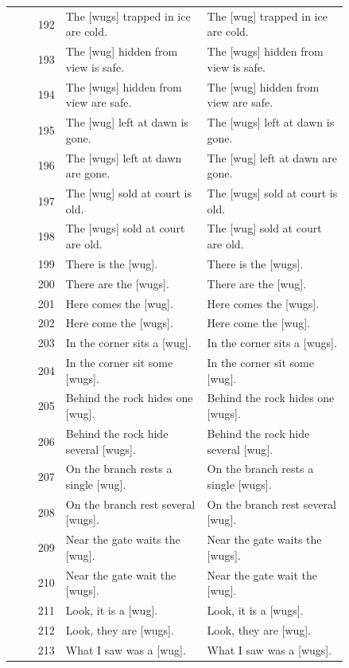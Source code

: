 \begin{longtable}{@{}rp{0.42\linewidth}p{0.42\linewidth}@{}}
192 & The {[}wugs{]} trapped in ice are cold. & The {[}wug{]} trapped in ice are cold. \\
193 & The {[}wug{]} hidden from view is safe. & The {[}wugs{]} hidden from view is safe. \\
194 & The {[}wugs{]} hidden from view are safe. & The {[}wug{]} hidden from view are safe. \\
195 & The {[}wug{]} left at dawn is gone. & The {[}wugs{]} left at dawn is gone. \\
196 & The {[}wugs{]} left at dawn are gone. & The {[}wug{]} left at dawn are gone. \\
197 & The {[}wug{]} sold at court is old. & The {[}wugs{]} sold at court is old. \\
198 & The {[}wugs{]} sold at court are old. & The {[}wug{]} sold at court are old. \\
199 & There is the {[}wug{]}. & There is the {[}wugs{]}. \\
200 & There are the {[}wugs{]}. & There are the {[}wug{]}. \\
201 & Here comes the {[}wug{]}. & Here comes the {[}wugs{]}. \\
202 & Here come the {[}wugs{]}. & Here come the {[}wug{]}. \\
203 & In the corner sits a {[}wug{]}. & In the corner sits a {[}wugs{]}. \\
204 & In the corner sit some {[}wugs{]}. & In the corner sit some {[}wug{]}. \\
205 & Behind the rock hides one {[}wug{]}. & Behind the rock hides one {[}wugs{]}. \\
206 & Behind the rock hide several {[}wugs{]}. & Behind the rock hide several {[}wug{]}. \\
207 & On the branch rests a single {[}wug{]}. & On the branch rests a single {[}wugs{]}. \\
208 & On the branch rest several {[}wugs{]}. & On the branch rest several {[}wug{]}. \\
209 & Near the gate waits the {[}wug{]}. & Near the gate waits the {[}wugs{]}. \\
210 & Near the gate wait the {[}wugs{]}. & Near the gate wait the {[}wug{]}. \\
211 & Look, it is a {[}wug{]}. & Look, it is a {[}wugs{]}. \\
212 & Look, they are {[}wugs{]}. & Look, they are {[}wug{]}. \\
213 & What I saw was a {[}wug{]}. & What I saw was a {[}wugs{]}. \\

\end{longtable}

